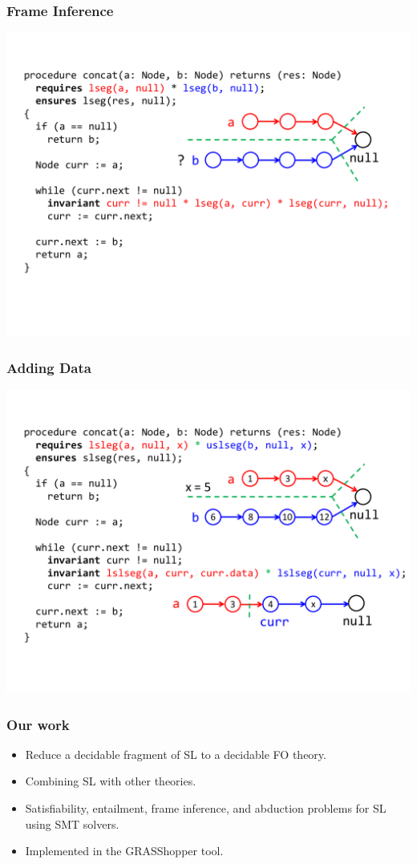 \documentclass{beamer}
\begin{document}
\begin{frame}
  \frametitle{Frame Inference}
  \includegraphics[scale=0.4]{resources/frame.pdf}
\end{frame}

\begin{frame}
  \frametitle{Adding Data}
  \includegraphics[scale=0.4]{resources/sorted.pdf}
\end{frame}

\begin{frame}
  \frametitle{Our work}

  \begin{itemize}
  \item Reduce a decidable fragment of SL to a decidable FO theory.
  \item Combining SL with other theories.
  \item Satisfiability, entailment, frame inference, and abduction problems for SL using SMT solvers.
  \item Implemented in the GRASShopper tool.
  \end{itemize}

\end{frame}
\end{document}
